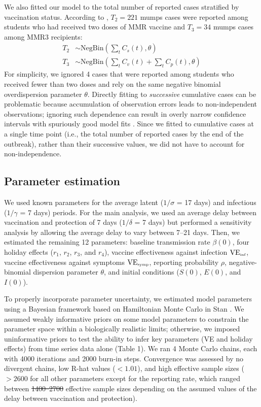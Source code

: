 \documentclass[12pt]{article}
\providecommand{\DIFaddtex}[1]{{\protect\color{blue}\uwave{#1}}} %
\providecommand{\DIFdeltex}[1]{{\protect\color{red}\sout{#1}}}                      %
\providecommand{\DIFaddbegin}{} %
\providecommand{\DIFaddend}{} %
\providecommand{\DIFdelbegin}{} %
\providecommand{\DIFdelend}{} %
\providecommand{\DIFadd}[1]{\texorpdfstring{\DIFaddtex{#1}}{#1}} %
\providecommand{\DIFdel}[1]{\texorpdfstring{\DIFdeltex{#1}}{}} %
\newcommand{\DIFscaledelfig}{0.5}
\newlength{\DIFdelgraphicswidth} %
\newlength{\DIFdelgraphicsheight} %
\newcommand{\DIFaddincludegraphics}[2][]{{\color{blue}\fbox{\DIFOincludegraphics[#1]{#2}}}} %
\newcommand{\DIFdelincludegraphics}[2][]{%
\sbox{\DIFdelgraphicsbox}{\DIFOincludegraphics[#1]{#2}}%
\settoboxwidth{\DIFdelgraphicswidth}{\DIFdelgraphicsbox} %
\settoboxtotalheight{\DIFdelgraphicsheight}{\DIFdelgraphicsbox} %
\scalebox{\DIFscaledelfig}{%
\parbox[b]{\DIFdelgraphicswidth}{\usebox{\DIFdelgraphicsbox}\\[-\baselineskip] \rule{\DIFdelgraphicswidth}{0em}}\llap{\resizebox{\DIFdelgraphicswidth}{\DIFdelgraphicsheight}{%
\setlength{\unitlength}{\DIFdelgraphicswidth}%
\begin{picture}(1,1)%
\thicklines\linethickness{2pt} %
{\color[rgb]{1,0,0}\put(0,0){\framebox(1,1){}}}%
{\color[rgb]{1,0,0}\put(0,0){\line( 1,1){1}}}%
{\color[rgb]{1,0,0}\put(0,1){\line(1,-1){1}}}%
\end{picture}%
}\hspace*{3pt}}} %
} %
\DeclareRobustCommand{\DIFaddbegin}{\DIFOaddbegin \let\includegraphics\DIFaddincludegraphics} %
\DeclareRobustCommand{\DIFaddend}{\DIFOaddend \let\includegraphics\DIFOincludegraphics} %
\DeclareRobustCommand{\DIFdelbegin}{\DIFOdelbegin \let\includegraphics\DIFdelincludegraphics} %
\DeclareRobustCommand{\DIFdelend}{\DIFOaddend \let\includegraphics\DIFOincludegraphics} %
\begin{document}
We also fitted our model to the total number of reported cases stratified by vaccination status.
According to \cite{cardemil2017effectiveness}, $T_2 = 221$ mumps cases were reported among students who had received two doses of MMR vaccine and $T_3 = 34$ mumps cases among MMR3 recipients:
\begin{align}
T_2 &\sim \mathrm{NegBin}\left(\sum_{t} C_s(t), \theta\right)\\
T_3 &\sim \mathrm{NegBin}\left(\sum_{t} C_v(t) + \sum_{t} C_p(t), \theta\right)
\end{align}
For simplicity, we ignored 4 cases that were reported among students who received fewer than two doses and rely on the same negative binomial overdispersion parameter $\theta$.
Directly fitting to \emph{successive} cumulative cases can be problematic because accumulation of observation errors leads to non-independent observations;
ignoring such dependence can result in overly narrow confidence intervals with spuriously good model fits \citep{king2015avoidable}.
Since we fitted to cumulative cases at a single time point (i.e., the total number of reported cases by the end of the outbreak), rather than their successive values, we did not have to account for non-independence.

\subsection{Parameter estimation}

We used known parameters for the average latent ($1/\sigma$ = 17 days) and infectious ($1/\gamma$ = 7 days) periods.
For the main analysis, we used an average delay between vaccination and protection of 7 days ($1/\delta$ = 7 days) but performed a sensitivity analysis by allowing the average delay to vary between 7--21 days.
Then, we estimated the remaining 12 parameters: baseline transmission rate $\beta(0)$, four holiday effects ($r_1$, $r_2$, $r_3$, and $r_4$), vaccine effectiveness against infection $\mathrm{VE}_{\textrm{\tiny{inf}}}$, vaccine effectiveness against symptoms $\mathrm{VE}_{\textrm{\tiny{symp}}}$, reporting probability $\rho$, negative-binomial dispersion parameter $\theta$, and initial conditions ($S(0)$, $E(0)$, and $I(0)$).

To properly incorporate parameter uncertainty, we estimated model parameters using a Bayesian framework based on Hamiltonian Monte Carlo in Stan \citep{carpenter2017stan}.
We assumed weakly informative priors on some model parameters to constrain the parameter space within a biologically realistic limits;
otherwise, we imposed uninformative priors to test the ability to infer key parameters (VE and holiday effects) from time series data alone (Table 1).
We ran 4 Monte Carlo chains, each with 4000 iterations and 2000 burn-in steps.
Convergence was assessed by no divergent chains, low R-hat values ($< 1.01$), and high effective sample sizes ($>2600$ for all other parameters except for the reporting rate, which ranged between \DIFdelbegin \DIFdel{1400--2700 }\DIFdelend \DIFaddbegin \DIFadd{500--1000 }\DIFaddend effective sample sizes depending on the assumed values of the delay between vaccination and protection).
\end{document}
